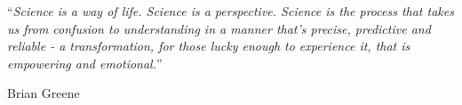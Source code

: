 \documentclass[
11pt, %
english, %
onehalfspacing %
]{MastersDoctoralThesis} %
\begin{document}
\noindent\enquote{\itshape Science is a way of life. Science is a perspective. Science is the process that takes us from confusion to understanding in a manner that's precise, predictive and reliable - a transformation, for those lucky enough to experience it, that is empowering and emotional.}\bigbreak

\hfill Brian Greene


\begin{abstract}
\addchaptertocentry{\abstractname} %



\end{abstract}


\begin{resum}
\addchaptertocentry{\resumname} %



\end{resum}


\begin{acknowledgements}
\addchaptertocentry{\acknowledgementname} %



\end{acknowledgements}

\end{document}
